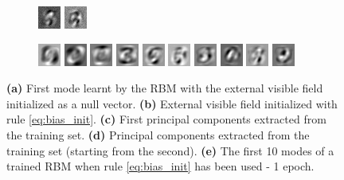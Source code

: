 \documentclass{revtex4-1}
\begin{document}
\begin{figure}
\begin{subfigure}{\linewidth}
    \includegraphics[width=.05\linewidth]{W_l_eigv_9.png}
    \includegraphics[width=.05\linewidth]{W_l_eigv_10.png}
    \caption{}
    \label{fig:modes_tr}
  \end{subfigure}\par
  \begin{subfigure}{\linewidth}
    \includegraphics[width=.05\linewidth]{W_10_l_eigv_1.png}
    \includegraphics[width=.05\linewidth]{W_10_l_eigv_2.png}
    \includegraphics[width=.05\linewidth]{W_10_l_eigv_3.png}
    \includegraphics[width=.05\linewidth]{W_10_l_eigv_4.png}
    \includegraphics[width=.05\linewidth]{W_10_l_eigv_5.png}
    \includegraphics[width=.05\linewidth]{W_10_l_eigv_6.png}
    \includegraphics[width=.05\linewidth]{W_10_l_eigv_7.png}
    \includegraphics[width=.05\linewidth]{W_10_l_eigv_8.png}
    \includegraphics[width=.05\linewidth]{W_10_l_eigv_9.png}
    \includegraphics[width=.05\linewidth]{W_10_l_eigv_10.png}
    \caption{}
    \label{fig:modes_tr_10}
  \end{subfigure}
   \caption{\textbf{(a)} First mode learnt by the RBM with the external visible field initialized as a null vector. \textbf{(b)} External visible field initialized with rule \eqref{eq:bias_init}. \textbf{(c)} First principal components extracted from the training set. \textbf{(d)} Principal components extracted from the training set (starting from the second). \textbf{(e)} The first 10 modes of a trained RBM when rule \eqref{eq:bias_init}  has been used - 1 epoch.}
\end{figure}
\end{document}
